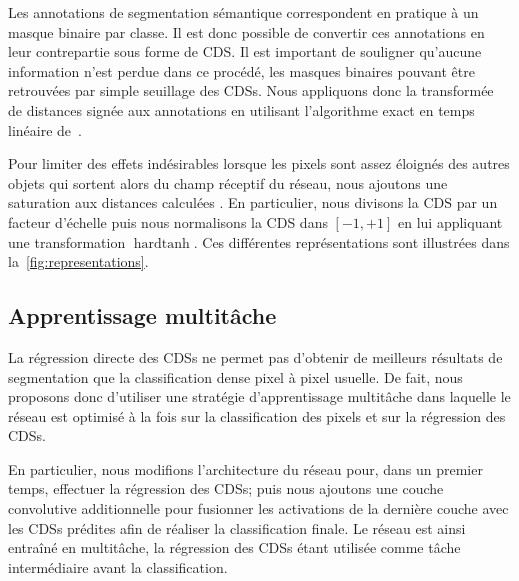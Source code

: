 Les annotations de segmentation sémantique correspondent en pratique à un masque binaire par classe. Il est donc possible de convertir ces annotations en leur contrepartie sous forme de \gls{CDS}. Il est important de souligner qu'aucune information n'est perdue dans ce procédé, les masques binaires pouvant être retrouvées par simple seuillage des \glspl{CDS}. Nous appliquons donc la transformée de distances signée aux annotations en utilisant l'algorithme exact en temps linéaire de~\citet{maurer_linear_2003}.

Pour limiter des effets indésirables lorsque les pixels sont assez éloignés des autres objets qui sortent alors du champ réceptif du réseau, nous ajoutons une saturation aux distances calculées . En particulier, nous divisons la \gls{CDS} par un facteur d'échelle puis nous normalisons la \gls{CDS} dans $[-1,+1]$ en lui appliquant une transformation $\operatorname{hardtanh}$. Ces différentes représentations sont illustrées dans la~\cref{fig:representations}.

\begin{figure*}[!t]
	\centering
	\resizebox{\textwidth}{!}{}
    \label{fig:distance_framework}
\end{figure*}

\subsection{Apprentissage multitâche}

La régression directe des \glspl{CDS} ne permet pas d'obtenir de meilleurs résultats de segmentation que la classification dense pixel à pixel usuelle. De fait, nous proposons donc d'utiliser une stratégie d'apprentissage multitâche dans laquelle le réseau est optimisé à la fois sur la classification des pixels et sur la régression des \glspl{CDS}.

En particulier, nous modifions l'architecture du réseau pour, dans un premier temps, effectuer la régression des \glspl{CDS}; puis nous ajoutons une couche convolutive additionnelle pour fusionner les activations de la dernière couche avec les \glspl{CDS} prédites afin de réaliser la classification finale. Le réseau est ainsi entraîné en multitâche, la régression des \glspl{CDS} étant utilisée comme tâche intermédiaire avant la classification.

